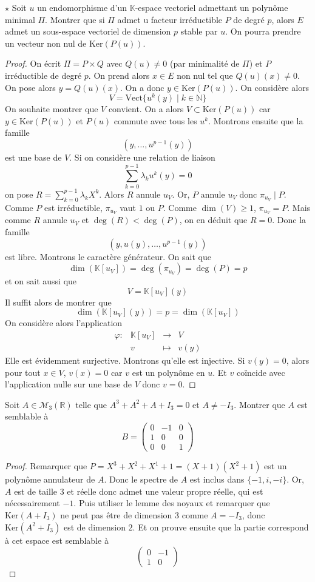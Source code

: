 \documentclass[french,a4paper]{article}
\newcommand{\N}{\mathbb{N}}
\newcommand{\R}{\mathbb{R}}
\newcommand{\K}{\mathbb{K}}
\renewcommand{\ker}{\text{Ker}}
\theoremstyle{plain}
\theoremstyle{definition}
\theoremstyle{remark}
\begin{document}
\begin{ex}{$\star$}
	Soit $u$ un endomorphisme d'un $\K$-espace vectoriel admettant un polynôme minimal $\Pi$. Montrer que si $\Pi$ admet u facteur irréductible $P$ de degré $p$, alors $E$ admet un sous-espace vectoriel de dimension $p$ stable par $u$. On pourra prendre un vecteur non nul de $\ker(P(u))$.
\end{ex}
\begin{proof}
	On écrit $\Pi=P\times Q$ avec $Q(u)\ne0$ (par minimalité de $\Pi$) et $P$ irréductible de degré $p$. On prend alors $x\in E$ non nul tel que $Q(u)(x)\ne0$. On pose alors $y=Q(u)(x)$. On a donc $y\in\ker(P(u))$. On considère alors $$V=\text{Vect}\{u^k(y)\mid k\in\N\}$$ On souhaite montrer que $V$ convient. On a alors $V\subset \ker(P(u))$ car $y\in\ker(P(u))$ et $P(u)$ commute avec tous les $u^k$. Montrons ensuite que la famille $$(y,\ldots,u^{p-1}(y))$$ est une base de $V$. Si on considère une relation de liaison $$\sum_{k=0}^{p-1}\lambda_k u^k(y)=0$$ on pose $R=\displaystyle\sum_{k=0}^{p-1}\lambda_k X^k$. Alors $R$ annule $u_V$. Or, $P$ annule $u_V$ donc $\pi_{u_V}\mid P$. Comme $P$ est irréductible, $\pi_{u_V}$ vaut $1$ ou $P$. Comme $\dim(V)\geqslant1$, $\pi_{u_V}=P$. Mais comme $R$ annule $u_V$ et $\deg(R)<\deg(P)$, on en déduit que $R=0$. Donc la famille $$(y,u(y),\ldots,u^{p-1}(y))$$ est libre. Montrons le caractère générateur. On sait que $$\dim(\K[u_V])=\deg(\pi_{u_V})=\deg(P)=p$$ et on sait aussi que $$V=\K[u_V](y)$$ Il suffit alors de montrer que $$\dim(\K[u_V](y))=p=\dim(\K[u_V])$$ On considère alors l'application $$\begin{array}{lrcl}
		\varphi:&\K[u_V]&\longrightarrow&V\\
		&v&\longmapsto&v(y)
	\end{array}$$ Elle est évidemment surjective. Montrons qu'elle est injective. Si $v(y)=0$, alors pour tout $x\in V$, $v(x)=0$ car $v$ est un polynôme en $u$. Et $v$ coïncide avec l'application nulle sur une base de $V$ donc $v=0$.
\end{proof}

\begin{ex}{}
	Soit $A\in\mathcal{M}_3(\R)$ telle que $A^3+A^2+A+I_3=0$ et $A\ne -I_3$. Montrer que $A$ est semblable à $$B=\begin{pmatrix}
		0&-1&0\\
		1&0&0\\
		0&0&1
	\end{pmatrix}$$
\end{ex}
\begin{proof}
	Remarquer que $P=X^3+X^2+X^1+1=(X+1)(X^2+1)$ est un polynôme annulateur de $A$. Donc le spectre de $A$ est inclus dans $\{-1,i,-i\}$. Or, $A$ est de taille 3 et réelle donc admet une valeur propre réelle, qui est nécessairement $-1$. Puis utiliser le lemme des noyaux et remarquer que $\ker(A+I_3)$ ne peut pas être de dimension $3$ comme $A=-I_3$, donc $\ker(A^2+I_3)$ est de dimension $2$. Et on prouve ensuite que la partie correspond à cet espace est semblable à $$\begin{pmatrix}
		0&-1\\
		1&0
	\end{pmatrix}$$
\end{proof}
\end{document}
